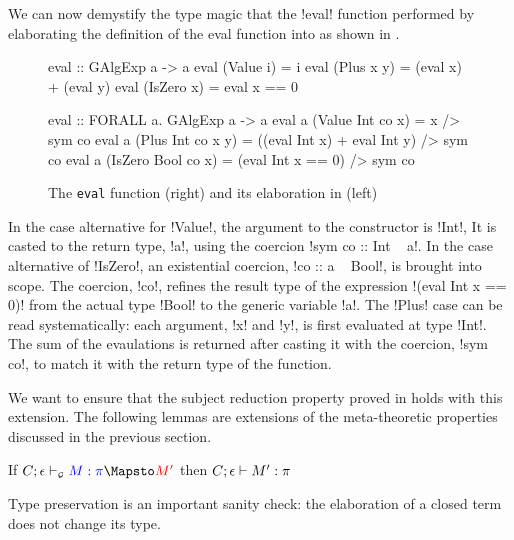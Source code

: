 \documentclass[screen,nonacm,manuscript,review]{acmart} %
\begin{document}
We can now demystify the type magic that the !eval! function
performed by elaborating the definition of the eval function into \SFC as shown in .

\begin{figure}[h]
\begin{minipage}[ht]{0.5\linewidth}
\begin{CenteredBox}
\begin{code}
eval :: GAlgExp a -> a
eval (Value i) = i
eval (Plus x y)
   = (eval x) + (eval y)
eval (IsZero x)
   = eval x == 0
\end{code}
\end{CenteredBox}
\end{minipage}%
\begin{minipage}[ht]{0.5\linewidth}
\begin{CenteredBox}
\begin{code}
eval :: FORALL a. GAlgExp a -> a
eval a (Value Int co x) = x /> sym co
eval a (Plus Int co x y)
   = ((eval Int x) + eval Int y) /> sym co
eval a (IsZero Bool co x)
   = (eval Int x == 0) /> sym co
\end{code}
\end{CenteredBox}
\end{minipage}
\caption[Encoding eval]{The \texttt{eval} function (right) and its elaboration in \SFC (left)}
 \label{fig:encoding-eval}
\end{figure}

In the case alternative for !Value!, the argument to the constructor is !Int!,
It is casted to the return type, !a!, using the coercion !sym co :: Int ~ a!.
In the case alternative of !IsZero!, an existential
coercion, !co :: a ~ Bool!, is brought into scope. The coercion, !co!, refines
the result type of the expression !(eval Int x == 0)!
from the actual type !Bool! to the generic variable !a!. The !Plus! case
can be read systematically: each argument,
!x! and !y!, is first evaluated at type !Int!. The sum of the evaulations
is returned after casting it with the coercion, !sym co!, to match it
with the return type of the function.

We want to ensure that the subject reduction property proved
in  holds with this extension.
The following lemmas are extensions of the meta-theoretic properties
discussed in the previous section.

\begin{lemma}\label{lem:gadt-type-preservation}
 If $\GTranslate C \empt \Tm \pi {\Tm'}$ then $C;\epsilon \vdash M' : \pi$
\end{lemma}
Type preservation is an important sanity check: the elaboration of a closed term
does not change its type.
\end{document}
